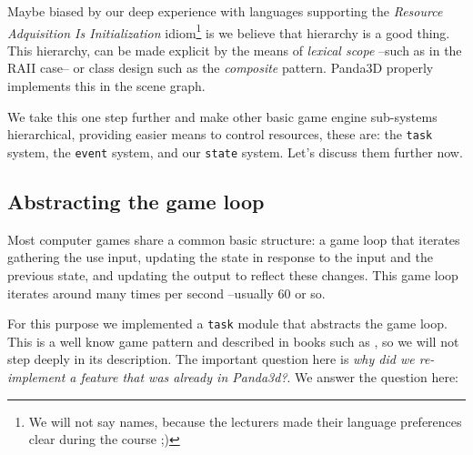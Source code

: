 \documentclass[a4paper,10pt]{article}
\begin{document}
Maybe biased by our deep experience with languages supporting the
\emph{Resource Adquisition Is Initialization} idiom\footnote{We will
  not say names, because the lecturers made their language preferences
  clear during the course ;)} is we believe that hierarchy is a good thing. This
hierarchy, can be made explicit by the means of \emph{lexical scope}
--such as in the RAII case-- or class design such as the
\emph{composite}\cite{gamma95design} pattern. Panda3D properly implements this
in the scene graph. 

We take this one step further and make other basic game engine
sub-systems hierarchical, providing easier means to control
resources, these are: the \texttt{task} system, the \texttt{event}
system, and our \texttt{state} system. Let's discuss them further now.

\subsection{Abstracting the game loop}

Most computer games share a common basic structure: a game loop that
iterates gathering the use input, updating the state in response to
the input and the previous state, and updating the output to reflect
these changes. This game loop iterates around many times per second
--usually 60 or so.

For this purpose we implemented a \texttt{task} module that abstracts
the game loop. This is a well know game pattern and described in books
such as \cite{mcshaffry03game}, so we will not step deeply in its
description. The important question here is \emph{why did we
  re-implement a feature that was already in Panda3d?}. We answer the
question here:
\end{document}
